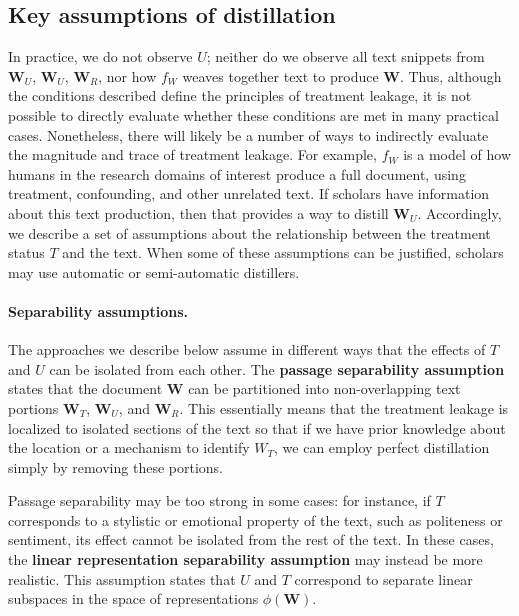 \documentclass[11pt]{article}
\newcommand{\bW}{\bm{W}}  %
\begin{document}
\subsection{Key assumptions of distillation}
In practice, we do not observe $U$; neither do we observe all text snippets from $\bW_U$, $\bW_U$, $\bW_R$, nor how $f_W$ weaves together text to produce $\bW$. Thus, although the conditions described define the principles of treatment leakage, it is not possible to directly evaluate whether these conditions are met in many practical cases. Nonetheless, there will likely be a number of ways to indirectly evaluate the magnitude and trace of treatment leakage. For example, $f_W$ is a model of how humans in the research domains of interest produce a full document, using treatment, confounding, and other unrelated text. If scholars have information about this text production, then that provides a way to distill $\bW_U$. Accordingly, we describe a set of assumptions about the relationship between the treatment status $T$ and the text. When some of these assumptions can be justified, scholars may use automatic or semi-automatic distillers.


\paragraph{Separability assumptions.} The approaches we describe below assume in different ways that the effects of $T$ and $U$ can be isolated from each other.
%
The \textbf{passage separability assumption} states that the document $\bm{W}$ can be partitioned into non-overlapping text portions $\bm{W}_T$, $\bm{W}_U$, and $\bm{W}_R$. This essentially means that the treatment leakage is localized to isolated sections of the text so that if we have prior knowledge about the location or a mechanism to identify $W_T$, we can employ perfect distillation simply by removing these portions.
%

Passage separability may be too strong in some cases: for instance, if $T$ corresponds to a stylistic or emotional property of the text, such as politeness or sentiment, its effect cannot be isolated from the rest of the text.
%
In these cases, the \textbf{linear representation separability assumption} may instead be more realistic. This assumption states that $U$ and $T$ correspond to separate linear subspaces in the space of representations $\phi(\bW)$.
\end{document}
